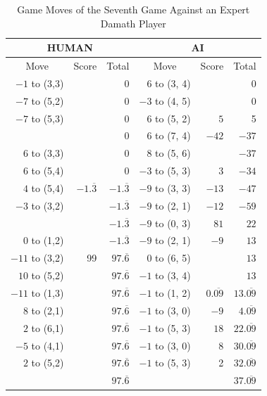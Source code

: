 \begin{appendices}
\begin{table}[H]
    \centering
    \begin{tabular}{rrrrrr}
        \hline
        \multicolumn{3}{c}{HUMAN}        & \multicolumn{3}{c}{AI}     \\ \hline
        \multicolumn{1}{c}{Move}         & \multicolumn{1}{c}{Score} & \multicolumn{1}{c}{Total} & \multicolumn{1}{c}{Move}         & \multicolumn{1}{c}{Score} & \multicolumn{1}{c}{Total} \\ \hline
         $-1$ to (3,3) &       &  0    &   6 to (3, 4) &       &  0    \\ \hline
         $-7$ to (5,2) &       &  0    &   $-3$ to (4, 5) &       &  0    \\ \hline
         $-7$ to (5,3) &       &  0    &   $6$ to (5, 2) & $5$    &  5    \\ \hline
                       &       &  0    &   $6$ to (7, 4) & $-42$    &  $-37$  \\ \hline
         $6$ to (3,3)  &       &  0    &   $8$ to (5, 6) &        &  $-37$    \\ \hline
         $6$ to (5,4)  &       &  0    &   $-3$ to (5, 3) & $3$    &  $-34$    \\ \hline
         $4$ to (5,4)  & $-1.\overline3$ &  $-1.\overline3$   &   $-9$ to (3, 3) & $-13$    &  $-47$    \\ \hline
         $-3$ to (3,2)  &       &  $-1.\overline3$    &   $-9$ to (2, 1) & $-12$    &  $-59$    \\ \hline
                        &       &  $-1.\overline3$    &   $-9$ to (0, 3) & $81$    &  $22$    \\ \hline
         $0$ to (1,2)  &       &  $-1.\overline3$     &   $-9$ to (2, 1) & $-9$    &  $13$    \\ \hline
         $-11$ to (3,2)  &   99 &  $97.\overline6$     &   $0$ to (6, 5) &         &  $13$    \\ \hline
         $10$ to (5,2)  &       &  $97.\overline6$     &   $-1$ to (3, 4) &         &  $13$    \\ \hline
         $-11$ to (1,3)  &       &  $97.\overline6$     &   $-1$ to (1, 2) & $0.\overline{09}$ &  $13.\overline{09}$    \\ \hline
         $8$ to (2,1)  &       &  $97.\overline6$     &   $-1$ to (3, 0) & $-9$ &  $4.\overline{09}$    \\ \hline
         $2$ to (6,1)  &       &  $97.\overline6$     &   $-1$ to (5, 3) & $18$ &  $22.\overline{09}$    \\ \hline
         $-5$ to (4,1)  &       &  $97.\overline6$     &   $-1$ to (3, 0) & 8 &  $30.\overline{09}$    \\ \hline
         $2$ to (5,2)  &        &  $97.\overline6$     &   $-1$ to (5, 3) & 2 &  $32.\overline{09}$    \\ \hline \hline
                       &        &  $97.\overline6$     &                  &   &  $37.\overline{09}$    \\ \hline
    \end{tabular}
    \caption{Game Moves of the Seventh Game Against an Expert Damath Player}
    \label{tab:seventh-game}
\end{table}


\end{appendices}
